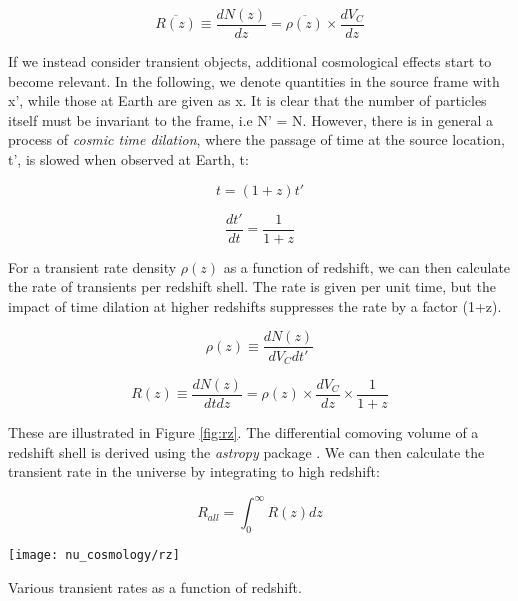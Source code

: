 \begin{equation}
\overline{R(z)} \equiv \frac{dN(z)}{dz} = \overline{\rho(z)} \times \frac{dV_{C}}{dz}
\label{eq:steady_rate}
\end{equation}

If we instead consider transient objects, additional cosmological effects start to become relevant. In the following, we denote quantities in the source frame with x', while those at Earth are given as x. It is clear that the number of particles itself must be invariant to the frame, i.e N' = N. However, there is in general a process of \emph{cosmic time dilation}, where the passage of time at the source location, t', is slowed when observed at Earth, t:

\begin{equation}
t = (1+z)t'
\label{eq:t}
\end{equation}

\begin{equation}
\frac{dt'}{dt} = \frac{1}{1+z}
\label{eq:dt}
\end{equation}

For a transient rate density $\rho (z)$ as a function of redshift, we can then calculate the rate of transients per redshift shell. The rate is given per unit time, but the impact of time dilation at higher redshifts suppresses the rate by a factor (1+z). 

\begin{equation}
\rho(z) \equiv \frac{dN(z)}{dV_{C}dt'}
\end{equation}

\begin{equation}
R(z) \equiv \frac{dN(z)}{dtdz} = \rho(z) \times \frac{dV_{C}}{dz} \times \frac{1}{1+z}
\label{eq:transient_rate}
\end{equation}

These are illustrated in Figure \ref{fig:rz}. The differential comoving volume of a redshift shell is derived using the \emph{astropy} package . We can then calculate the transient rate in the universe by integrating to high redshift:

\begin{equation}
R_{all} = \int_{0}^{\infty} R(z) dz
\end{equation}

\begin{marginfigure}
	\centering \texttt{[image: nu\_cosmology/rz]}
	\caption{Various transient rates as a function of redshift.}
	\label{fig:rz}
\end{marginfigure}

